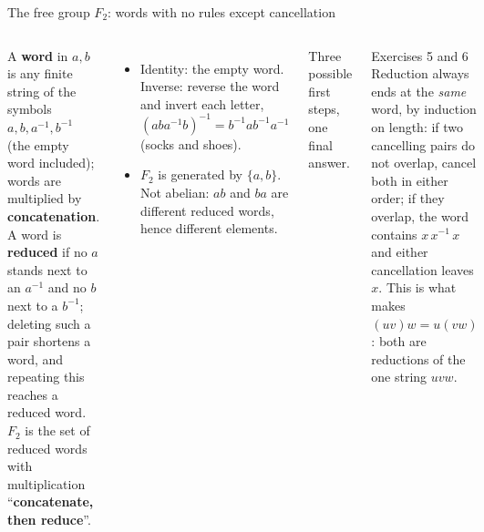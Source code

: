 \documentclass[aspectratio=169,10pt]{beamer}
\newcommand{\inv}{^{-1}}
\begin{document}
\begin{frame}{The free group $F_2$: words with no rules except cancellation}
\begin{columns}[T]
\begin{defbox}
A \textbf{word} in $a,b$ is any finite string of the symbols $a,b,a\inv,b\inv$ (the empty word included); words are multiplied by \textbf{concatenation}. A word is \textbf{reduced} if no $a$ stands next to an $a\inv$ and no $b$ next to a $b\inv$; deleting such a pair shortens a word, and repeating this reaches a reduced word.\\
$F_2$ is the set of reduced words with multiplication ``\textbf{concatenate, then reduce}''.
\end{defbox}
\begin{itemize}
\item Identity: the empty word. Inverse: reverse the word and invert each letter, $(aba\inv b)\inv=b\inv ab\inv a\inv$ (socks and shoes).
\item $F_2$ is generated by $\{a,b\}$. Not abelian: $ab$ and $ba$ are different reduced words, hence different elements.
\end{itemize}
\centering\scalebox{0.9}{\figreduce}\par
{\scriptsize Three possible first steps, one final answer.}
\begin{exbox}{Exercises 5 and 6}
Reduction always ends at the \emph{same} word, by induction on length: if two cancelling pairs do not overlap, cancel both in either order; if they overlap, the word contains $x\,x\inv\,x$ and either cancellation leaves $x$. This is what makes $(uv)w=u(vw)$: both are reductions of the one string $uvw$.
\end{exbox}
\end{columns}
\end{frame}
\end{document}
